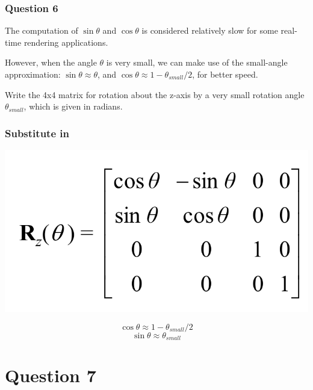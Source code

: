 \documentclass{beamer}
\begin{document}
\begin{frame}
    \frametitle{Question 6}

    The computation of $\sin \theta$ and $\cos \theta$ is considered relatively slow 
    for some real-time rendering applications. \\

    \vspace{1em}

    However, when the angle $\theta$ is very small, we can make use of the small-angle 
    approximation: $\sin \theta \approx \theta$, and $\cos \theta \approx 1 - \theta_{small}/2$, 
    for better speed.\\

    \vspace{1em}
    
    Write the 4x4 matrix for rotation about the z-axis by a very small rotation angle $\theta_{small}$, 
    which is given in radians. 

\end{frame}

\begin{frame}
    \frametitle{Substitute in}

    \begin{center}
        \includegraphics[scale=0.3]{rot-mat.png}
    \end{center}
    
    \begin{tcolorbox}
        $$ \cos \theta \approx 1 - \theta_{small}/2 $$
        $$ \sin \theta \approx \theta_{small} $$
    \end{tcolorbox}

\end{frame}

\section{Question 7}
\end{document}
